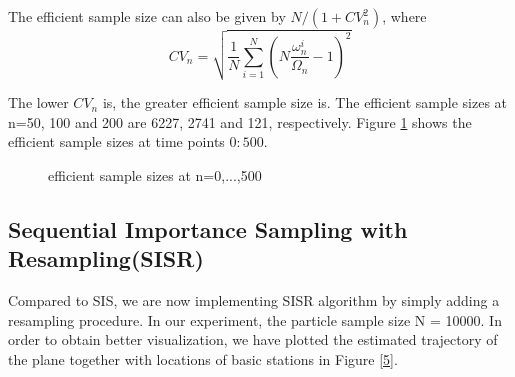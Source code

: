 \documentclass{article}
\begin{document}
        


The efficient sample size can also be given by $N/(1+CV_n^2)$, where 
\begin{equation}
    CV_n=\sqrt{\frac{1}{N}\sum_{i=1}^N(N\frac{\omega_n^i}{\Omega_n}-1)^2}
\end{equation}

The lower $CV_n$ is, the greater efficient sample size is. The efficient sample sizes at n=50, 100 and 200 are 6227, 2741 and 121, respectively. Figure \ref{4} shows the efficient sample sizes at time points $0:500$.

\begin{figure}[h]
        \caption{\label{4} efficient sample sizes at n=0,...,500}
    \end{figure}

\subsection{Sequential Importance Sampling with Resampling(SISR)}
Compared to SIS, we are now implementing SISR algorithm by simply adding a resampling procedure. In our experiment, the particle sample size N = 10000. In order to obtain better visualization, we have plotted the estimated trajectory of the plane together with locations of basic stations in Figure \ref{5}.
\end{document}
